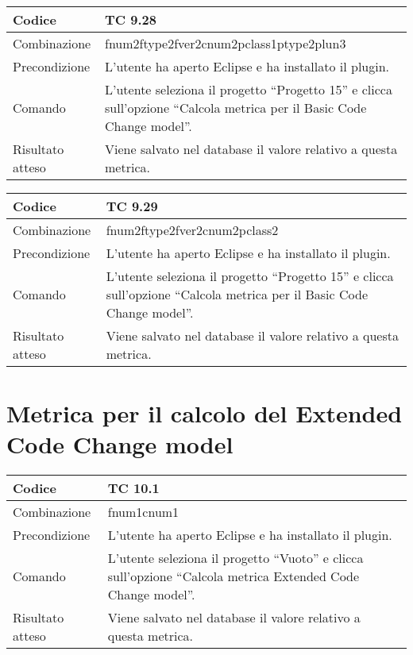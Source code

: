 \begin{table}[ht]
\begin{tabular}{|p{3cm}|p{9cm}|}
\hline
\cellcolor{lightgray}Codice				& TC 9.28								\\
\hline
\cellcolor{lightgray}Combinazione		& fnum2ftype2fver2cnum2pclass1ptype2plun3									\\
\hline
\cellcolor{lightgray}Precondizione		& L'utente ha aperto Eclipse e ha installato il plugin.		\\
\hline
\cellcolor{lightgray}Comando			& L'utente seleziona il progetto ``Progetto 15''  e clicca sull'opzione ``Calcola metrica per il Basic Code Change model''.	\\
\hline
\cellcolor{lightgray}Risultato atteso	& Viene salvato nel database il valore relativo a questa metrica.\\
\hline
\end{tabular}
\end{table}


\begin{table}[ht]
\begin{tabular}{|p{3cm}|p{9cm}|}
\hline
\cellcolor{lightgray}Codice				& TC 9.29								\\
\hline
\cellcolor{lightgray}Combinazione		& fnum2ftype2fver2cnum2pclass2									\\
\hline
\cellcolor{lightgray}Precondizione		& L'utente ha aperto Eclipse e ha installato il plugin.		\\
\hline
\cellcolor{lightgray}Comando			& L'utente seleziona il progetto ``Progetto 15''  e clicca sull'opzione ``Calcola metrica per il Basic Code Change model''.	\\
\hline
\cellcolor{lightgray}Risultato atteso	& Viene salvato nel database il valore relativo a questa metrica.\\
\hline
\end{tabular}
\end{table}

\clearpage

\section{Metrica per il calcolo del Extended Code Change model}

\begin{table}[ht]
\begin{tabular}{|p{3cm}|p{9cm}|}
\hline
\cellcolor{lightgray}Codice				& TC 10.1								\\
\hline
\cellcolor{lightgray}Combinazione		& fnum1cnum1									\\
\hline
\cellcolor{lightgray}Precondizione		& L'utente ha aperto Eclipse e ha installato il plugin.		\\
\hline
\cellcolor{lightgray}Comando			& L'utente seleziona il progetto ``Vuoto''  e clicca sull'opzione ``Calcola metrica Extended Code Change model''.	\\
\hline
\cellcolor{lightgray}Risultato atteso	& Viene salvato nel database il valore relativo a questa metrica.\\
\hline
\end{tabular}
\end{table}


